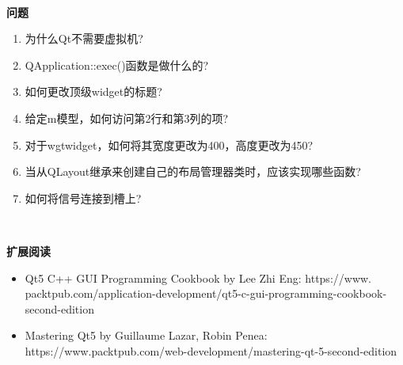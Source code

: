 \noindent\textbf{}\ \par
\textbf{问题} \ \par
\begin{enumerate}
	\item 为什么Qt不需要虚拟机?
	\item QApplication::exec()函数是做什么的?
	\item 如何更改顶级widget的标题?
	\item 给定m模型，如何访问第2行和第3列的项?
	\item 对于wgtwidget，如何将其宽度更改为400，高度更改为450?
	\item 当从QLayout继承来创建自己的布局管理器类时，应该实现哪些函数?
	\item 如何将信号连接到槽上?
\end{enumerate}

\noindent\textbf{}\ \par
\textbf{扩展阅读} \ \par
\begin{itemize}
	\item Qt5 C++ GUI Programming Cookbook by Lee Zhi Eng:  https:/​/​www.​packtpub.​com/application-​development/​qt5-​c-​gui-​programming-​cookbook-​second-​edition
	\item Mastering Qt5 by Guillaume Lazar, Robin Penea: \\ https:/​/​www.​packtpub.​com/web-​development/​mastering-​qt-​5-​second-​edition
\end{itemize}

\newpage



















